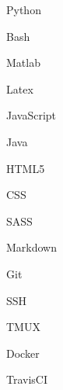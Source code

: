 
    \begin{cvskills}{4}{1}
                {\faCode}   %
                {           %
                    \begin{cvitems}
                        \item {Python}
                        \item {Bash}
                        \item {Matlab}
                        \item {Latex}
                        \item {JavaScript}
                        \item {Java}
                    \end{cvitems}
                }
                {\faMarkdown}   %
                {               %
                    \begin{cvitems}
                        \item {HTML5}
                        \item {CSS}
                        \item {SASS}
                        \item {Markdown}
                    \end{cvitems}
                }
                {\faDocker}     %
                {               %
                    \begin{cvitems}
                        \item {Git}
                        \item {SSH}
                        \item {TMUX}
                        \item {Docker}
                        \item {TravisCI}
                    \end{cvitems}
                }
    \end{cvskills}


